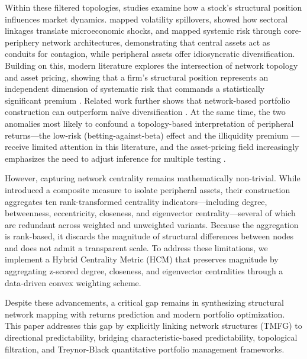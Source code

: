 \documentclass[fleqn]{rbfin}
\begin{document}
Within these filtered topologies, studies examine how a stock's structural position influences market dynamics. \citet{diebold2014network} mapped volatility spillovers, \citet{acemoglu2012network} showed how sectoral linkages translate microeconomic shocks, and \citet{pozzi2013spread} mapped systemic risk through core-periphery network architectures, demonstrating that central assets act as conduits for contagion, while peripheral assets offer idiosyncratic diversification. Building on this, modern literature explores the intersection of network topology and asset pricing, showing that a firm's structural position represents an independent dimension of systematic risk that commands a statistically significant premium \citep{Ahern2013, PeerMom2022}. Related work further shows that network-based portfolio construction can outperform naïve diversification \citep{PeraltaZareei2016}. At the same time, the two anomalies most likely to confound a topology-based interpretation of peripheral returns---the low-risk (betting-against-beta) effect \citep{frazzini2014betting} and the illiquidity premium \citep{amihud2002illiquidity}---receive limited attention in this literature, and the asset-pricing field increasingly emphasizes the need to adjust inference for multiple testing \citep{harvey2016and}.

However, capturing network centrality remains mathematically non-trivial. While \citet{pozzi2013spread} introduced a composite measure to isolate peripheral assets, their construction aggregates ten rank-transformed centrality indicators---including degree, betweenness, eccentricity, closeness, and eigenvector centrality---several of which are redundant across weighted and unweighted variants. Because the aggregation is rank-based, it discards the magnitude of structural differences between nodes and does not admit a transparent scale. To address these limitations, we implement a Hybrid Centrality Metric (HCM) that preserves magnitude by aggregating z-scored degree, closeness, and eigenvector centralities through a data-driven convex weighting scheme. 

Despite these advancements, a critical gap remains in synthesizing structural network mapping with returns prediction and modern portfolio optimization. This paper addresses this gap by explicitly linking network structures (TMFG) to directional predictability, bridging characteristic-based predictability, topological filtration, and Treynor-Black quantitative portfolio management frameworks.
\end{document}
